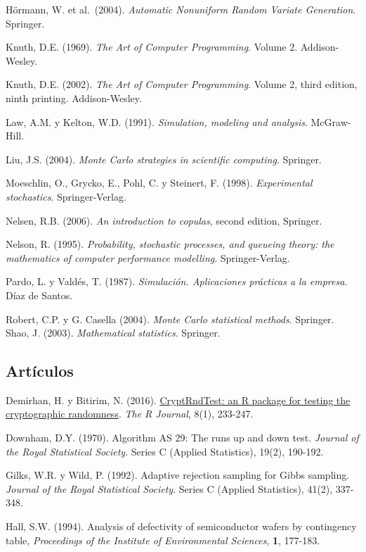 \documentclass[
]{book}
\theoremstyle{break}
\theoremstyle{nonumberplain}
\begin{document}
Hörmann, W. et al.~(2004). \emph{Automatic Nonuniform Random Variate Generation}. Springer.

Knuth, D.E. (1969). \emph{The Art of Computer Programming}. Volume 2. Addison-Wesley.

Knuth, D.E. (2002). \emph{The Art of Computer Programming}. Volume 2, third edition, ninth printing. Addison-Wesley.

Law, A.M. y Kelton, W.D. (1991). \emph{Simulation, modeling and analysis}. McGraw-Hill.

Liu, J.S. (2004). \emph{Monte Carlo strategies in scientific computing}. Springer.

Moeschlin, O., Grycko, E., Pohl, C. y Steinert, F. (1998). \emph{Experimental stochastics}. Springer-Verlag.

Nelsen, R.B. (2006). \emph{An introduction to copulas}, second edition, Springer.

Nelson, R. (1995). \emph{Probability, stochastic processes, and queueing theory: the mathematics of computer performance modelling}. Springer-Verlag.

Pardo, L. y Valdés, T. (1987). \emph{Simulación. Aplicaciones prácticas a la empresa}. Díaz de Santos.

Robert, C.P. y G. Casella (2004). \emph{Monte Carlo statistical methods}. Springer.
Shao, J. (2003). \emph{Mathematical statistics}. Springer.

\hypertarget{artuxedculos}{%
\subsection*{Artículos}\label{artuxedculos}}

Demirhan, H. y Bitirim, N. (2016). \href{https://journal.r-project.org/archive/2016/RJ-2016-016/index.html}{CryptRndTest: an R package for testing the cryptographic randomness}. \emph{The R Journal}, 8(1), 233-247.

Downham, D.Y. (1970). Algorithm AS 29: The runs up and down test. \emph{Journal of the Royal Statistical Society}. Series C (Applied Statistics), 19(2), 190-192.

Gilks, W.R. y Wild, P. (1992). Adaptive rejection sampling for Gibbs sampling. \emph{Journal of the Royal Statistical Society}. Series C (Applied Statistics), 41(2), 337-348.

Hall, S.W. (1994). Analysis of defectivity of semiconductor wafers by contingency table, \emph{Proceedings of the Institute of Environmental Sciences}, \textbf{1}, 177-183.
\end{document}
